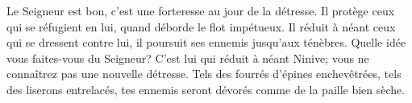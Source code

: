 Le Seigneur est bon, c’est une forteresse au jour de la détresse.
	Il protège ceux qui se réfugient en lui, quand déborde le flot impétueux.
Il réduit à néant ceux qui se dressent contre lui,
	il poursuit ses ennemis jusqu’aux ténèbres.
Quelle idée vous faites-vous du Seigneur?
C’est lui qui réduit à néant Ninive;
	vous ne connaîtrez pas une nouvelle détresse.
Tels des fourrés d’épines enchevêtrées, tels des liserons entrelacés,
	tes ennemis seront dévorés comme de la paille bien sèche.
